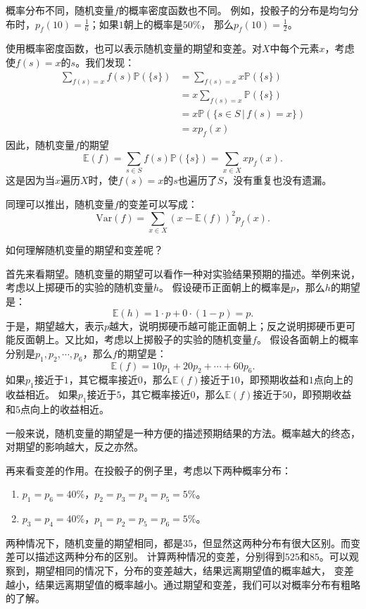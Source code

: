 \documentclass[12pt,UTF8]{ctexbook}
\theoremstyle{definition}
\theoremstyle{plain}
\begin{document}
概率分布不同，随机变量$f$的概率密度函数也不同。
例如，投骰子的分布是均匀分布时，$p_f(10) = \frac{1}{6}$；如果$1$朝上的概率是$50\%$，
那么$p_f(10) = \frac{1}{2}$。

使用概率密度函数，也可以表示随机变量的期望和变差。对$X$中每个元素$x$，考虑使$f(s) = x$的$s$。我们发现：
\begin{align*}
    \sum_{f(s) = x} f(s) \mathbb{P}(\{s\}) &= \sum_{f(s) = x} x \mathbb{P}(\{s\})  \\
    &= x \sum_{f(s) = x} \mathbb{P}(\{s\})  \\
    &= x \mathbb{P}(\{s \in S \,|\, f(s) = x\})  \\
    &= x p_f(x)   
\end{align*}
因此，随机变量$f$的期望
$$ \mathbb{E}(f) = \sum_{s\in S} f(s) \mathbb{P}(\{s\}) = \sum_{x \in X} x p_f(x). $$
这是因为当$x$遍历$X$时，使$f(s) = x$的$s$也遍历了$S$，没有重复也没有遗漏。

同理可以推出，随机变量$f$的变差可以写成：
$$ \mathrm{Var}(f)  = \sum_{x\in X} \left(x - \mathbb{E}(f)\right)^2 p_f(x).$$ 

如何理解随机变量的期望和变差呢？

首先来看期望。随机变量的期望可以看作一种对实验结果预期的描述。举例来说，考虑以上掷硬币的实验的随机变量$h$。
假设硬币正面朝上的概率是$p$，那么$h$的期望是：
$$ \mathbb{E}(h) = 1\cdot p + 0\cdot (1 - p) = p. $$
于是，期望越大，表示$p$越大，说明掷硬币越可能正面朝上；反之说明掷硬币更可能反面朝上。又比如，考虑以上掷骰子的实验的随机变量$f$。
假设各面朝上的概率分别是$p_1, p_2, \cdots , p_6$，那么$f$的期望是：
$$ \mathbb{E}(f) = 10p_1 + 20p_2 + \cdots + 60p_6. $$
如果$p_1$接近于$1$，其它概率接近$0$，那么$\mathbb{E}(f)$接近于$10$，即预期收益和$1$点向上的收益相近。
如果$p_1$接近于$5$，其它概率接近$0$，那么$\mathbb{E}(f)$接近于$50$，即预期收益和$5$点向上的收益相近。

一般来说，随机变量的期望是一种方便的描述预期结果的方法。概率越大的终态，对期望的影响越大，反之亦然。

再来看变差的作用。在投骰子的例子里，考虑以下两种概率分布：
\begin{enumerate}
    \item $p_1 = p_6 = 40\%$，$p_2 = p_3 = p_4 = p_5 = 5\%$。
    \item $p_3 = p_4 = 40\%$，$p_1 = p_2 = p_5 = p_6 = 5\%$。
\end{enumerate}
两种情况下，随机变量的期望相同，都是$35$，但显然这两种分布有很大区别。而变差可以描述这两种分布的区别。
计算两种情况的变差，分别得到$525$和$85$。可以观察到，期望相同的情况下，分布的变差越大，结果远离期望值的概率越大，
变差越小，结果远离期望值的概率越小。通过期望和变差，我们可以对概率分布有粗略的了解。
\end{document}
